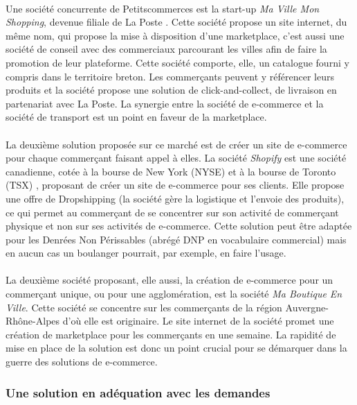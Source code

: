 \documentclass[a4paper, 12pt]{article}
\begin{document}
\paragraph{}Une société concurrente de Petitscommerces est la start-up \textit{Ma Ville Mon Shopping}, devenue filiale de La Poste \cite{mavillemonshopping}. Cette société propose un site internet, du même nom, qui propose la mise à disposition d’une marketplace, c’est aussi une société de conseil avec des commerciaux parcourant les villes afin de faire la promotion de leur plateforme. Cette société comporte, elle, un catalogue fourni y compris dans le territoire breton. Les commerçants peuvent y référencer leurs produits et la société propose une solution de click-and-collect, de livraison en partenariat avec La Poste. La synergie entre la société de e-commerce et la société de transport est un point en faveur de la marketplace.
\paragraph{}La deuxième solution proposée sur ce marché est de créer un site de e-commerce pour chaque commerçant faisant appel à elles. La société \textit{Shopify} est une société canadienne, cotée à la bourse de New York (NYSE) et à la bourse de Toronto (TSX) \cite{shopify}, proposant de créer un site de e-commerce pour ses clients. Elle propose une offre de Dropshipping (la société gère la logistique et l’envoie des produits), ce qui permet au commerçant de se concentrer sur son activité de commerçant physique et non sur ses activités de e-commerce. Cette solution peut être adaptée pour les Denrées Non Périssables (abrégé DNP en vocabulaire commercial) mais en aucun cas un boulanger pourrait, par exemple, en faire l’usage.
\paragraph{}La deuxième société proposant, elle aussi, la création de e-commerce pour un commerçant unique, ou pour une agglomération, est la société \textit{Ma Boutique En Ville}. Cette société se concentre sur les commerçants de la région Auvergne-Rhône-Alpes d’où elle est originaire. Le site internet \cite{maboutiqueenville} de la société promet une création de marketplace pour les commerçants en une semaine. La rapidité de mise en place de la solution est donc un point crucial pour se démarquer dans la guerre des solutions de e-commerce.

\subsubsection{Une solution en adéquation avec les demandes}
\end{document}
